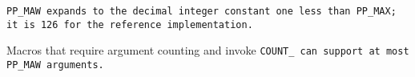 \tt{PP_MAW} expands to the decimal integer constant one less than \tt{PP_MAX};
it is 126 for the reference implementation.

\note Macros that require argument counting and invoke
\tt{COUNT_} can support at most \tt{PP_MAW} arguments.
